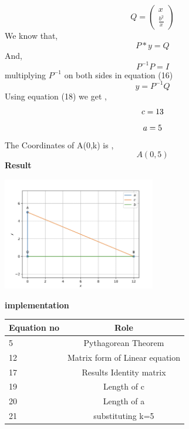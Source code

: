 \documentclass[10pt,a4paper]{report}
\begin{document}
\begin{multicols}{2}
\begin{equation}
  Q = \begin{pmatrix}
x\\
\frac{b^2}{x}
\end{pmatrix} 
\end{equation}\vspace{2mm}
We know that,\\
\begin{equation}
P * y = Q
\end{equation}
And,\\
\begin{equation}
P^{-1} P = I
\end{equation}
multiplying $P^{-1}$ on both sides in equation (16)\\
\begin{equation}
 y = P^{-1} Q
\end{equation}
Using equation (18) we get ,
\begin{equation}
c = 13 \vspace{2mm}
\end{equation}
\begin{equation}
 a = 5 \vspace{2mm}
\end{equation}
The Coordinates of A(0,k) is ,
\begin{equation}
  A(0,5)
\end{equation}
\textbf{Result} 
\begin{center}
 \includegraphics[width=0.5\textwidth]{matrix.jpg}  
 \end{center}\vspace{5mm}
 \vspace{2mm}  
\textbf{implementation}
\begin{center}
\setlength{\arrayrulewidth}{0.5mm}
\setlength{\tabcolsep}{5pt}
\renewcommand{\arraystretch}{3}
    \begin{tabular}{|l|c|}
    \hline 
    \textbf{Equation no} & \textbf{Role} \\ \hline
    5 &  Pythagorean Theorem \\ 
    12 & Matrix form of Linear equation  \\
    17 & Results Identity matrix  \\
    19 & Length of c\\
    20 & Length of a \\
    21 & substituting k=5\\
    \hline
      \end{tabular}
  \end{center} \vspace{2mm}
  

\end{multicols}
\end{document}
